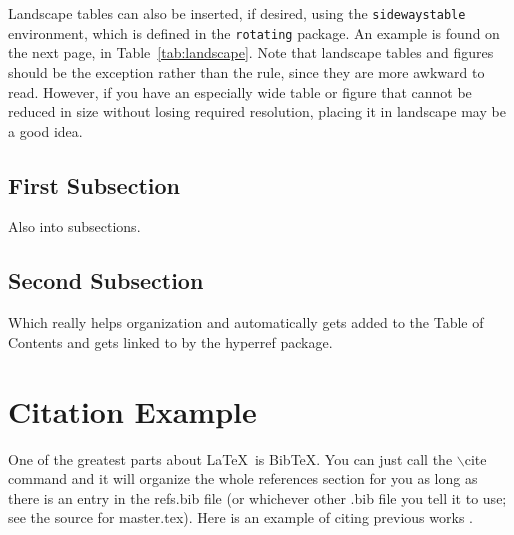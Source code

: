 Landscape tables can also be inserted, if desired, using the \verb-sidewaystable- environment, which is defined in the \verb!rotating! package. An example is found on the next page, in Table~\ref{tab:landscape}. Note that landscape tables and figures should be the exception rather than the rule, since they are more awkward to read. However, if you have an especially wide table or figure that cannot be reduced in size without losing required resolution, placing it in landscape may be a good idea.
\begin{sidewaystable}
\centering
{}
\ifdim\wd\tempbox<\TPTminimum\relax \tempwidth=\TPTminimum\relax
\else\tempwidth=\wd\tempbox
\fi
\begin{minipage}{\tempwidth}\centering
\caption{A landscape table}\vspace*{6pt}
\label{tab:landscape}
\usebox{\tempbox}
\end{minipage}
\end{sidewaystable}


\subsection{First Subsection}
Also into subsections.

\subsection{Second Subsection}
Which really helps organization and automatically gets added to the Table
of Contents and gets linked to by the hyperref package.

\section{Citation Example}
One of the greatest parts about \LaTeX\ is BibTeX. You can just call
the $\backslash$cite command and it will organize the whole references section for you as long as there is an entry in the refs.bib file (or whichever other .bib file you tell it to use; see the source for master.tex).
Here is an example of citing previous works
\cite{guy06best,guy06second}.

